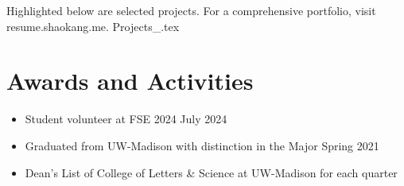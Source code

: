 \documentclass[letterpaper,11pt]{article}
\newcommand{\resumeItem}[1]{
  \item\small{
    {#1 \vspace{-2pt}}
  }
}
\newcommand{\resumeItemListStart}{\begin{itemize}}
\newcommand{\resumeItemListEnd}{\end{itemize}\vspace{-5pt}}
\begin{document}
Highlighted below are selected projects. For a comprehensive portfolio, visit resume.shaokang.me.
\vspace{0.5em}
{Projects_.tex}




\section{Awards and Activities}

\resumeItemListStart
\resumeItem{Student volunteer at FSE 2024 \hfill July 2024}
\resumeItem{Graduated from UW-Madison with distinction in the Major \hfill Spring 2021}
\resumeItem{Dean's List of College of Letters \& Science at UW-Madison for each quarter}
\resumeItemListEnd


\end{document}
